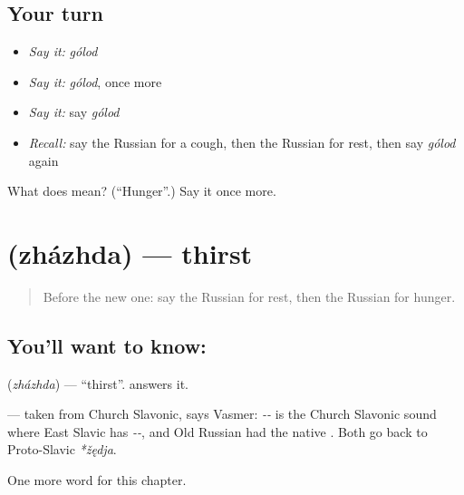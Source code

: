 \subsection*{Your turn}
\begin{itemize}
\raggedright
  \item \emph{Say it:} \emph{gólod}
  \item \emph{Say it:} \emph{gólod}, once more
  \item \emph{Say it:} say \emph{gólod}
  \item \emph{Recall:} say the Russian for a cough, then the Russian for rest, then say \emph{gólod} again
\end{itemize}

\begin{tcolorbox}[breakable,colback=teal!4,colframe=teal!35!black,title={Before you move on}]
What does  mean? (\textquotedblleft{}Hunger\textquotedblright{}.) Say it once more.
\end{tcolorbox}
\section[\texorpdfstring{\ru{жажда} (zházhda)}{жажда (zházhda)}]{ (zházhda) — thirst}

\label{lesson:RU-C33-thirst}



\begin{quote}
Before the new one: say the Russian for rest, then the Russian for hunger.
\end{quote}

\subsection*{You'll want to know: }
\textbf{} (\emph{zházhda}) — \textquotedblleft{}thirst\textquotedblright{}. \textbf{} answers it.

\begin{cousinweb}
\textbf{} — taken from Church Slavonic, says Vasmer: \emph{--} is the Church Slavonic sound where East Slavic has \emph{--}, and Old Russian had the native \emph{}. Both go back to Proto-Slavic \emph{*žędja}.
\end{cousinweb}

\begin{grammarlens}[title={What you've built}]
One more word for this chapter.
\end{grammarlens}

